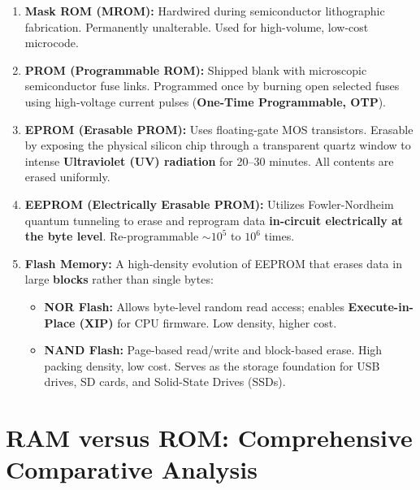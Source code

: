 \begin{enumerate}[label=\bfseries\arabic*.]
    \item \textbf{Mask ROM (MROM):} Hardwired during semiconductor lithographic fabrication. Permanently unalterable. Used for high-volume, low-cost microcode.
    \item \textbf{PROM (Programmable ROM):} Shipped blank with microscopic semiconductor fuse links. Programmed once by burning open selected fuses using high-voltage current pulses (\textbf{One-Time Programmable, OTP}).
    \item \textbf{EPROM (Erasable PROM):} Uses floating-gate MOS transistors. Erasable by exposing the physical silicon chip through a transparent quartz window to intense \textbf{Ultraviolet (UV) radiation} for 20--30 minutes. All contents are erased uniformly.
    \item \textbf{EEPROM (Electrically Erasable PROM):} Utilizes Fowler-Nordheim quantum tunneling to erase and reprogram data \textbf{in-circuit electrically at the byte level}. Re-programmable $\sim 10^5$ to $10^6$ times.
    \item \textbf{Flash Memory:} A high-density evolution of EEPROM that erases data in large \textbf{blocks} rather than single bytes:
    \begin{itemize}
        \item \textbf{NOR Flash:} Allows byte-level random read access; enables \textbf{Execute-in-Place (XIP)} for CPU firmware. Low density, higher cost.
        \item \textbf{NAND Flash:} Page-based read/write and block-based erase. High packing density, low cost. Serves as the storage foundation for USB drives, SD cards, and Solid-State Drives (SSDs).
    \end{itemize}
\end{enumerate}


\section{RAM versus ROM: Comprehensive Comparative Analysis}
\label{sec:ram_vs_rom}

